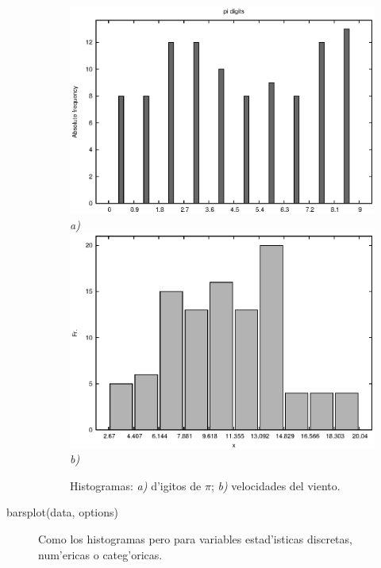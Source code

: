 \documentclass[spanish,12pt,a4paper]{article}
\begin{document}
\begin{description}
\begin{figure}
\begin{center}
\includegraphics[scale=1.0]{histogram1.eps} \\
\emph{a)} \\ 
\includegraphics[scale=1.0]{histogram2.eps} \\
\emph{b)} \\
\caption{Histogramas: \emph{a)} d'igitos de $\pi$; \emph{b)} velocidades del viento.}
\label{fig4}
\end{center}
\end{figure}

\item[barsplot(data, options)] Como los histogramas pero para variables estad'isticas discretas, num'ericas o categ'oricas.


\end{description}
\end{document}
